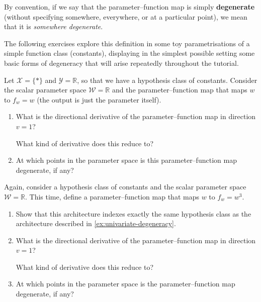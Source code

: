 \documentclass[11pt]{article}
\newcommand{\R}{\mathbb{R}}
\newcommand{\X}{\mathcal{X}}
\newcommand{\Y}{\mathcal{Y}}
\newcommand{\W}{\mathcal{W}}
\begin{document}
By convention, if we say that the parameter--function map is simply
\textbf{degenerate} (without specifying somewhere, everywhere, or at a
particular point), we mean that it is \emph{somewhere degenerate}.

The following exercises explore this definition in some toy parametrisations of a simple function class (constants), displaying in the simplest possible setting some basic forms of degeneracy that will arise repeatedly throughout the tutorial.

\begin{exercise}
\label{ex:univariate-degeneracy}
Let $\X = \{\ast\}$ and $\Y = \R$, so that we have a hypothesis class of constants. Consider the scalar parameter space $\W = \R$ and the parameter--function map that maps $w$ to $f_w = w$ (the output is just the parameter itself).
\begin{enumerate}
    \item What is the directional derivative of the parameter--function map in
        direction $v = 1$?
    \begin{hint}
What kind of derivative does this reduce to?
    \end{hint}
    \item At which points in the parameter space is this parameter--function map degenerate, if any?
\end{enumerate}
\end{exercise}

\begin{exercise}
\label{ex:cubic-degeneracy}
Again, consider a hypothesis class of constants and the scalar parameter space $\W = \R$. This time, define a parameter--function map that maps $w$ to $f_w = w^3$.
\begin{enumerate}
    \item Show that this architecture indexes exactly the same hypothesis class as the architecture described in \cref{ex:univariate-degeneracy}.
    \item What is the directional derivative of the parameter--function map in
        direction $v = 1$?
    \begin{hint}
What kind of derivative does this reduce to?
    \end{hint}
    \item At which points in the parameter space is the parameter--function map degenerate, if any?
\end{enumerate}
\end{exercise}
\end{document}
